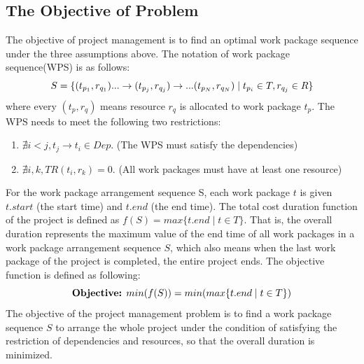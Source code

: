 \subsection{The Objective of Problem}
%
The objective of project management is to find an optimal work package sequence
under the three assumptions above.
The notation of work package sequence(WPS) is as follows:
\begin{equation}
\vspace{-2mm}
  S = \{
  (t_{p_1}, r_{q_1}) ... \rightarrow (t_{p_j}, r_{q_j}) \rightarrow ... (t_{p_N}, r_{q_N})
  \mid t_{p_i} \in T, r_{q_j} \in R
  \}
  \label{wps}
\end{equation}
where every $(t_p, r_q)$ means resource $r_q$ is allocated to work package $t_p$.
The WPS needs to meet the following two restrictions:
\begin{enumerate}
\item $\nexists i < j, t_j \rightarrow t_i \in Dep$.
  (The WPS must satisfy the dependencies)
\item $\nexists i, k, TR(t_i, r_k) = 0$.
  (All work packages must have at least one resource)
\end{enumerate}
For the work package arrangement sequence S, each work package $t$ is given
$t.start$ (the start time) and $t.end$ (the end time).  The total cost duration
function of the project is defined as $f(S) = max\{t.end \mid t \in T\}$. That
is, the overall duration represents the maximum value of the end time of all
work packages in a work package arrangement sequence $S$, which also means when the
last work package of the project is completed, the entire project ends.
The objective function is defined as following:
\begin{equation}
  \text{\textbf{Objective:}    } min(f(S)) = min(max\{t.end \mid t \in T\})
\end{equation}
The objective of the project management problem is to find a work
package sequence $S$ to arrange the whole project under the condition
of satisfying the restriction of dependencies and resources, so that
the overall  duration is minimized.







